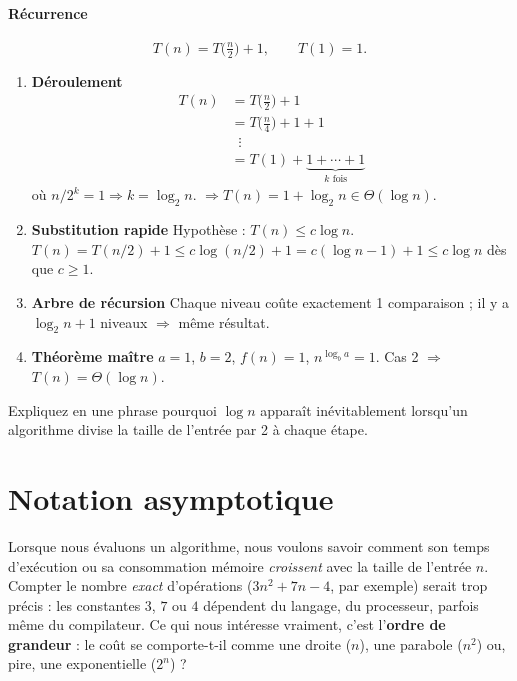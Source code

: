 \paragraph{Récurrence}
\[
T(n)=T\!\bigl(\tfrac{n}{2}\bigr)+1,\qquad T(1)=1.
\]

\begin{enumerate}[label=\alph*)]
  \item \textbf{Déroulement}
        \[
        \begin{aligned}
        T(n)&=T\!\bigl(\tfrac{n}{2}\bigr)+1\\
             &=T\!\bigl(\tfrac{n}{4}\bigr)+1+1\\
             &\;\;\vdots\\
             &=T(1)+\underbrace{1+\cdots+1}_{k\text{ fois}}
        \end{aligned}
        \]
        où \(n/2^{k}=1\Rightarrow k=\log_2 n\).
        \(\Rightarrow T(n)=1+\log_2 n\in\Theta(\log n).\)

  \item \textbf{Substitution rapide}
        Hypothèse : \(T(n)\le c\log n\).
        \(T(n)=T(n/2)+1\le c\log(n/2)+1
               =c(\log n-1)+1\le c\log n\) dès que \(c\ge1\).

  \item \textbf{Arbre de récursion}
        Chaque niveau coûte exactement 1 comparaison ; il y a
        \(\log_2 n+1\) niveaux $\Rightarrow$ même résultat.

  \item \textbf{Théorème maître}
        $a=1$, $b=2$, $f(n)=1$, \(n^{\log_b a}=1\).
        Cas 2 $\Rightarrow$ \(T(n)=\Theta(\log n)\).
\end{enumerate}

\begin{exercice}[Discussion]
Expliquez en une phrase pourquoi \(\log n\) apparaît inévitablement lorsqu’un
algorithme divise la taille de l’entrée par 2 à chaque étape.
\end{exercice}

\section{Notation asymptotique}

Lorsque nous évaluons un algorithme, nous voulons savoir comment son
temps d’exécution ou sa consommation mémoire \emph{croissent} avec la taille
de l’entrée $n$.  Compter le nombre \emph{exact} d’opérations
($3n^{2}+7n-4$, par exemple) serait trop précis : les constantes $3$, $7$ ou
$4$ dépendent du langage, du processeur, parfois même du compilateur.
Ce qui nous intéresse vraiment, c’est l’\textbf{ordre de grandeur} :
le coût se comporte-t-il comme une droite ($n$), une parabole ($n^{2}$) ou,
pire, une exponentielle ($2^{n}$) ?

